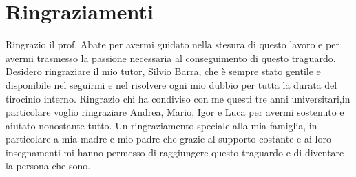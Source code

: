 \pagestyle{empty}
\fancyhf{}
\cfoot{\thepage}
\pagestyle{fancy}
\chapter{Ringraziamenti}
\vspace{2cm}


Ringrazio il prof. Abate per avermi guidato nella stesura di questo lavoro e per avermi trasmesso la passione 
necessaria al conseguimento di questo traguardo.
Desidero ringraziare il mio tutor, Silvio Barra, che è sempre stato gentile e disponibile nel seguirmi e nel risolvere ogni mio dubbio per tutta la durata del tirocinio interno.
Ringrazio chi ha condiviso con me questi tre anni universitari,in particolare voglio ringraziare Andrea, Mario, Igor e Luca per avermi sostenuto e aiutato nonostante tutto.
Un ringraziamento speciale alla mia famiglia, in particolare a mia madre e mio padre che grazie al supporto costante e ai loro insegnamenti mi hanno permesso di raggiungere questo traguardo e di diventare la persona che sono.
